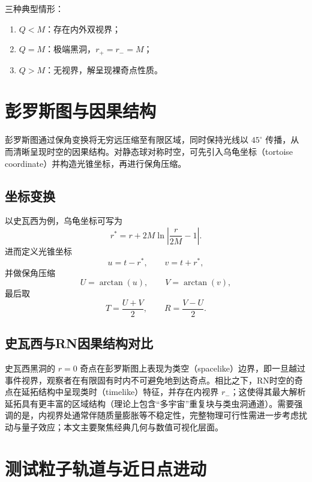 \documentclass[a4paper,12pt]{article}
\numberwithin{equation}{section}
\begin{document}
三种典型情形：
\begin{enumerate}
\item $Q<M$：存在内外双视界；
\item $Q=M$：极端黑洞，$r_+=r_-=M$；
\item $Q>M$：无视界，解呈现裸奇点性质。
\end{enumerate}

\section{彭罗斯图与因果结构}

彭罗斯图通过保角变换将无穷远压缩至有限区域，同时保持光线以 $45^\circ$ 传播，从而清晰呈现时空的因果结构。对静态球对称时空，可先引入乌龟坐标（tortoise coordinate）并构造光锥坐标，再进行保角压缩。

\subsection{坐标变换}

以史瓦西为例，乌龟坐标可写为
\begin{equation}
r^*=r+2M\ln\left|\frac{r}{2M}-1\right|.
\end{equation}
进而定义光锥坐标
\begin{equation}
u=t-r^*,\qquad v=t+r^*,
\end{equation}
并做保角压缩
\begin{equation}
U=\arctan(u),\qquad V=\arctan(v),
\end{equation}
最后取
\begin{equation}
T=\frac{U+V}{2},\qquad R=\frac{V-U}{2}.
\end{equation}

\subsection{史瓦西与RN因果结构对比}

史瓦西黑洞的 $r=0$ 奇点在彭罗斯图上表现为类空（spacelike）边界，即一旦越过事件视界，观察者在有限固有时内不可避免地到达奇点。相比之下，RN时空的奇点在延拓结构中呈现类时（timelike）特征，并存在内视界 $r_-$；这使得其最大解析延拓具有更丰富的区域结构（理论上包含“多宇宙”重复块与类虫洞通道）。需要强调的是，内视界处通常伴随质量膨胀等不稳定性，完整物理可行性需进一步考虑扰动与量子效应；本文主要聚焦经典几何与数值可视化层面。

\section{测试粒子轨道与近日点进动}
\end{document}
